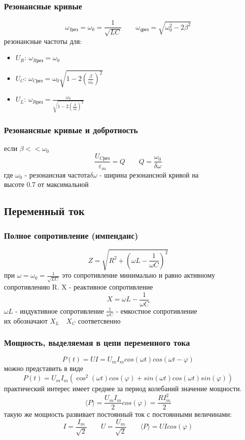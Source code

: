 \documentclass{article}
\begin{document}
\subsubsection{
    Резонансные кривые
}
\[\omega_{I\text{рез}} = \omega_0 = \frac{1}{\sqrt{LC}} \qquad \omega_{q\text{рез}} = \sqrt{\omega_0^2 - 2\beta^2}\]
резонансные частоты для:
\begin{itemize}
    \item $U_R$: $\omega_{R\text{рез}} = \omega_0$
    \item $U_C$: $\omega_{C\text{рез}} = \omega_0\sqrt{1 - 2(\frac{\beta}{\omega_0}) ^ 2}$
    \item $U_L$: $\omega_{R\text{рез}} = \frac{\omega_0}{\sqrt{1 - 2(\frac{\beta}{\omega_0}) ^ 2}}$ 
\end{itemize}
\subsubsection{
    Резонансные кривые и добротность
}
если $\beta << \omega_0$
\[\frac{U_{C\text{рез}}}{\varepsilon_m} = Q \qquad Q = \frac{\omega_0}{\delta \omega}\]
где $\omega_0$ - резонансная частота$\delta \omega$ - ширина резонансной кривой на\\ 
высоте 0.7 от максимальной
\subsection{
    Переменный ток
}
\subsubsection{
    Полное сопротивление (импенданс)
}
\[Z = \sqrt{R^2 + (\omega L - \frac{1}{\omega C}) ^ 2}\]
при $\omega = \omega_0 = \frac{1}{\sqrt{LC}}$ это сопротивление минимально и равно активному \\
сопротивлению R.
X - реактивное сопротивление
\[X = \omega L - \frac{1}{\omega C}\]
$\omega L$ - индуктивное сопротивление $ \frac{1}{\omega C}$ - емкостное сопротивление \\
их обозначают $X_L \quad X_C$ соответсвенно
\subsubsection{
    Мощность, выделяемая в цепи переменного тока
}
\[P(t) = UI = U_mI_mcos(\omega t)cos(\omega t - \varphi)\]
можно представить в виде
\[P(t) = U_mI_m(\cos^2(\omega t)cos(\varphi) + sin(\omega t) cos(\omega t) sin(\varphi))\]
практический интерес имеет среднее за период колебаний значение мощности.
\[\langle P\rangle = \frac{U_mI_m}{2}cos(\varphi) = \frac{RI^2_m}{2}\]
такую же мощность развивает постоянный ток с постоянными величинами: 
\[I = \frac{I_m}{\sqrt{2}} \qquad U = \frac{U_m}{\sqrt{2}} \qquad \langle P\rangle = UIcos(\varphi)\]
\end{document}
